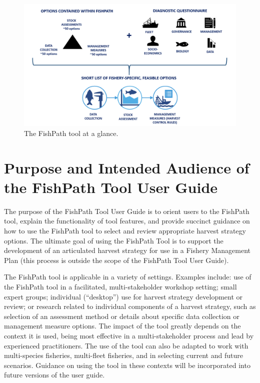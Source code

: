 \documentclass[
  11pt,
]{book}
\begin{document}
\begin{figure}

{\centering \includegraphics[width=0.75\linewidth]{images/fishpath-tool-overview-diagram} 

}

\caption{The FishPath tool at a glance.}\label{fig:overview}
\end{figure}

\hypertarget{purpose-and-intended-audience-of-the-fishpath-tool-user-guide}{%
\section{Purpose and Intended Audience of the FishPath Tool User Guide}\label{purpose-and-intended-audience-of-the-fishpath-tool-user-guide}}

The purpose of the FishPath Tool User Guide is to orient users to the FishPath tool, explain the functionality of tool features, and provide succinct guidance on how to use the FishPath tool to select and review appropriate harvest strategy options. The ultimate goal of using the FishPath Tool is to support the development of an articulated harvest strategy for use in a Fishery Management Plan (this process is outside the scope of the FishPath Tool User Guide).

The FishPath tool is applicable in a variety of settings. Examples include: use of the FishPath tool in a facilitated, multi-stakeholder workshop setting; small expert groups; individual (``desktop'') use for harvest strategy development or review; or research related to individual components of a harvest strategy, such as selection of an assessment method or details about specific data collection or management measure options. The impact of the tool greatly depends on the context it is used, being most effective in a multi-stakeholder process and lead by experienced practitioners. The use of the tool can also be adapted to work with multi-species fisheries, multi-fleet fisheries, and in selecting current and future scenarios. Guidance on using the tool in these contexts will be incorporated into future versions of the user guide.
\end{document}
